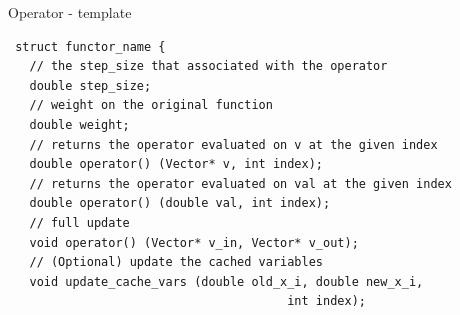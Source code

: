 \documentclass[hyperref,handout,compress,9pt,mathserif]{beamer}
\begin{document}
\begin{frame}[fragile]{Operator - template}
\begin{small}
\begin{lstlisting}
 struct functor_name {                                                                                                                                                           
   // the step_size that associated with the operator                                                                                                                            
   double step_size;                                                                                                                                                             
   // weight on the original function                                                                                                    
   double weight;                                                                                                                                                                                                                                                                                                                                                 
   // returns the operator evaluated on v at the given index                                                                                                                       
   double operator() (Vector* v, int index);                                                                                                                                                            
   // returns the operator evaluated on val at the given index                                                                                                                       
   double operator() (double val, int index);                                                                                                               
   // full update                                                                                                                                                                          
   void operator() (Vector* v_in, Vector* v_out);
   // (Optional) update the cached variables                                                                                                                                   
   void update_cache_vars (double old_x_i, double new_x_i, 
                                       int index);                                                                                                                                                                                

\end{lstlisting}
\end{small}
\end{frame}
\end{document}
